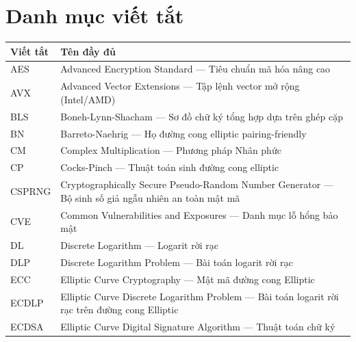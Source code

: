 
\clearpage
{}

\chapter*{Danh mục viết tắt}

\begin{longtable}[]{@{}
  >{\raggedright\arraybackslash}p{}
  >{\raggedright\arraybackslash}p{}@{}}
\toprule\noalign{}
\begin{minipage}[b]{\linewidth}\raggedright
Viết tắt
\end{minipage} & \begin{minipage}[b]{\linewidth}\raggedright
Tên đầy đủ
\end{minipage} \\
\midrule\noalign{}
\endhead
\bottomrule\noalign{}
\endlastfoot
AES & Advanced Encryption Standard --- Tiêu chuẩn mã hóa nâng cao \\
AVX & Advanced Vector Extensions --- Tập lệnh vector mở rộng
(Intel/AMD) \\
BLS & Boneh-Lynn-Shacham --- Sơ đồ chữ ký tổng hợp dựa trên ghép cặp \\
BN & Barreto-Naehrig --- Họ đường cong elliptic pairing-friendly \\
CM & Complex Multiplication --- Phương pháp Nhân phức \\
CP & Cocks-Pinch --- Thuật toán sinh đường cong elliptic \\
CSPRNG & Cryptographically Secure Pseudo-Random Number Generator --- Bộ
sinh số giả ngẫu nhiên an toàn mật mã \\
CVE & Common Vulnerabilities and Exposures --- Danh mục lỗ hổng bảo
mật \\
DL & Discrete Logarithm --- Logarit rời rạc \\
DLP & Discrete Logarithm Problem --- Bài toán logarit rời rạc \\
ECC & Elliptic Curve Cryptography --- Mật mã đường cong Elliptic \\
ECDLP & Elliptic Curve Discrete Logarithm Problem --- Bài toán logarit
rời rạc trên đường cong Elliptic \\
ECDSA & Elliptic Curve Digital Signature Algorithm --- Thuật toán chữ ký

\end{longtable}
